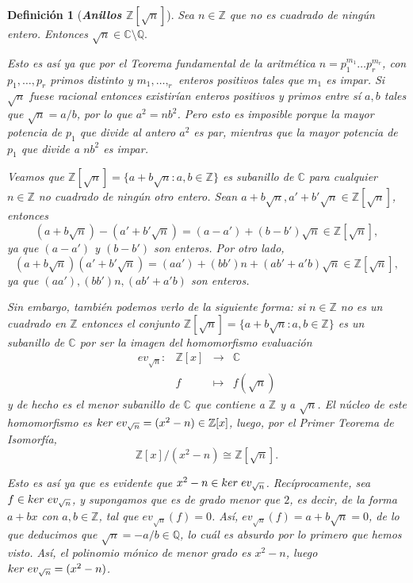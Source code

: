 \documentclass[12pt]{article}
\newtheorem{definition}[theorem]{Definición}
\begin{document}
\begin{definition}[\textbf{\textit{Anillos $\mathbb{Z}[\sqrt{n}]$}}]

Sea $n \in \mathbb{Z}$ que no es cuadrado de ningún entero. Entonces $\sqrt{n} \in \mathbb{C} \setminus \mathbb{Q}.$

Esto es así ya que por el \textit{Teorema fundamental de la aritmética} $n = p_1^{m_1}\ldots p_r^{m_r}$, con $p_1, \ldots, p_r$ primos distinto y $m_1, \ldots, _r$ enteros positivos tales que $m_1$ es impar. Si $\sqrt{n}$ fuese racional entonces existirían enteros positivos y primos entre sí $a,b$ tales que $\sqrt{n} = a/b$, por lo que $a^2 = nb^2$. Pero esto es imposible porque la mayor potencia de $p_1$ que divide al antero $a^2$ es par, mientras que la mayor potencia de $p_1$ que divide a $nb^2$ es impar.

Veamos que $\mathbb{Z}[\sqrt{n}] = \lbrace a + b\sqrt{n}:a,b \in \mathbb{Z}\rbrace$ es subanillo de $\mathbb{C}$ para cualquier $n \in \mathbb{Z}$ no cuadrado de ningún otro entero. Sean $a+b\sqrt{n}, a'+b'\sqrt{n} \in  \mathbb{Z}[\sqrt{n}]$, entonces $$(a+b\sqrt{n})- (a'+b'\sqrt{n}) = (a-a') + (b-b')\sqrt{n} \in \mathbb{Z}[\sqrt{n}],$$ ya que $(a-a')$ y $(b-b')$ son enteros. Por otro lado, $$(a+b\sqrt{n})(a'+b'\sqrt{n}) = (aa') + (bb')n +(ab'+a'b)\sqrt{n} \in \mathbb{Z}[\sqrt{n}],$$  ya que $(aa'),(bb')n,(ab'+a'b)$ son enteros.

Sin embargo, también podemos verlo de la siguiente forma: si $n \in \mathbb{Z}$ no es un cuadrado en $\mathbb{Z}$ entonces el conjunto $\mathbb{Z}[\sqrt{n}]=\lbrace a + b \sqrt{n}:a,b \in \mathbb{Z} \rbrace $ es un subanillo de $\mathbb{C}$ por ser la imagen del homomorfismo evaluación $$\begin{array}{rccl}
ev_{\sqrt{n}} \colon &\mathbb{Z}[x]&\longrightarrow &\mathbb{C} \\
&f& \longmapsto &f(\sqrt{n})
\end{array}
$$
y de hecho es el menor subanillo de $\mathbb{C}$ que contiene a $\mathbb{Z}$ y a $\sqrt{n}$. El núcleo de este homomorfismo es $ker \hspace{0.1cm} ev_{\sqrt{n}} = (x^2-n) \in \mathbb{Z}[x]$, luego, por el \textit{Primer Teorema de Isomorfía}, $$\mathbb{Z}[x]/(x^2-n) \cong \mathbb{Z}[\sqrt{n}].$$

Esto es así ya que es evidente que $x^2-n \in ker \hspace{0.1cm} ev_{\sqrt{n}}$. Recíprocamente, sea $f \in ker \hspace{0.1cm} ev_{\sqrt{n}}$, y supongamos que es de grado menor que $2$, es decir, de la forma $a+bx$ con $a,b \in \mathbb{Z}$, tal que $ev_{\sqrt{n}}(f)=0$. Así, $ev_{\sqrt{n}}(f)=a+b\sqrt{n} = 0$, de lo que deducimos que $\sqrt{n} = -a/b \in \mathbb{Q}$, lo cuál es absurdo por lo primero que hemos visto. Así, el polinomio mónico de menor grado es $x^2-n$, luego $ker \hspace{0.1cm} ev_{\sqrt{n}} = (x^2-n)$.


\end{definition}
\end{document}
